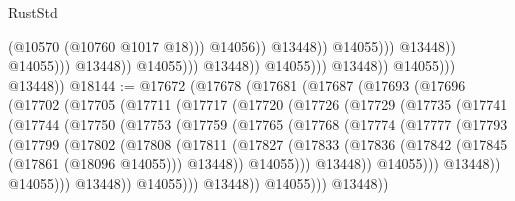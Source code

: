 \begin{lexlean}{RustStd}
\begin{coremodule}
                                                                (@10570 (@10760 @1017 @18)))
                                                              @14056))
                                                          @13448))
                                                      @14055)))
                                                @13448))
                                            @14055)))
                                      @13448))
                                  @14055)))
                            @13448))
                        @14055)))
                  @13448))
              @14055)))
        @13448))
@18144 := @17672
    (@17678
      (@17681
        (@17687
          (@17693
            (@17696
              (@17702
                (@17705
                  (@17711
                    (@17717
                      (@17720
                        (@17726
                          (@17729
                            (@17735
                              (@17741
                                (@17744
                                  (@17750
                                    (@17753
                                      (@17759
                                        (@17765
                                          (@17768
                                            (@17774
                                              (@17777
                                                (@17793
                                                  (@17799
                                                    (@17802
                                                      (@17808
                                                        (@17811
                                                          (@17827
                                                            (@17833
                                                              (@17836
                                                                (@17842
                                                                  (@17845 (@17861 (@18096 @14055)))
                                                                  @13448))
                                                              @14055)))
                                                        @13448))
                                                    @14055)))
                                              @13448))
                                          @14055)))
                                    @13448))
                                @14055)))
                          @13448))
                      @14055)))
                @13448))

\end{coremodule}
\end{lexlean}
